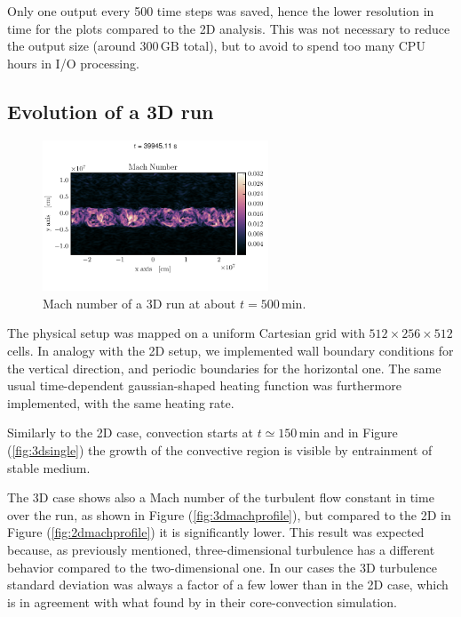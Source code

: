  Only one output every 500 time steps was saved, hence the lower resolution in time for the plots compared to the 2D analysis. This was not necessary to reduce the output size (around $300 \, \mathrm{GB}$ total), but to avoid to spend too many CPU hours in I/O processing.
\subsection{Evolution of a 3D run}

\begin{figure}[t!]
\centering
\includegraphics[width=0.6\textwidth]{./img/3dmach.pdf}
\caption{Mach number of a 3D run at about $t=500 \, \mathrm{min}$.}
\label{fig:3dmach}
\end{figure}

The physical setup was mapped on a uniform Cartesian grid with $512 \times 256 \times 512$ cells. In analogy with the 2D setup, we implemented wall boundary conditions for the vertical direction, and periodic boundaries for the horizontal one. The same usual time-dependent gaussian-shaped heating function was furthermore implemented, with the same heating rate.

Similarly to the 2D case, convection starts at $t \simeq 150 \, \mathrm{min}$ and in Figure (\ref{fig:3dsingle}) the growth of the convective region is visible by entrainment of stable medium.

The 3D case shows also a Mach number of the turbulent flow constant in time over the run, as shown in Figure (\ref{fig:3dmachprofile}), but compared to the 2D in Figure (\ref{fig:2dmachprofile}) it is significantly lower. This result was expected because, as previously mentioned, three-dimensional turbulence has a different behavior compared to the two-dimensional one. In our cases the 3D turbulence standard deviation was always a factor of a few lower than in the 2D case, which is in agreement with what found by \citet{meakin} in their core-convection simulation. 

